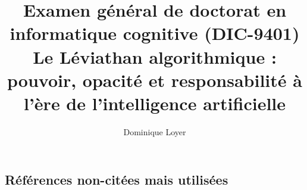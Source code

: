 \documentclass{memoireuqamV2}
\title{Examen général de doctorat en informatique cognitive (DIC-9401) \\ 
 \vspace{6em}
Le Léviathan algorithmique : pouvoir, opacité et responsabilité à l'ère de l'intelligence artificielle \\ \vspace{6em}}
\author{Dominique Loyer}
\begin{document}
\onehalfspacing
\maketitle
\clearpage



\onecolumn
\small
\tableofcontents
\newpage

\setlength{\parskip}{1em}












\renewcommand{\refname}{Références citées}


\subsection*{Références non-citées mais utilisées}
\renewcommand{\refname}{Références non-citées}



\clearpage
\appendix

\end{document}
